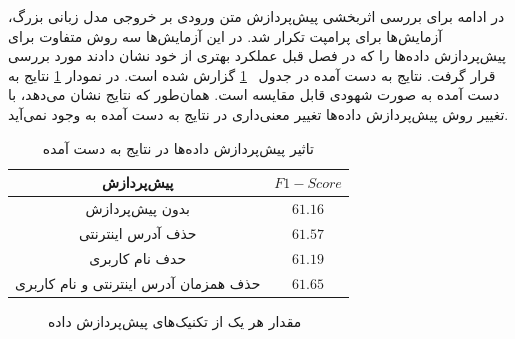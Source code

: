  
در ادامه برای بررسی اثربخشی پیش‌پردازش متن ورودی بر خروجی مدل زبانی بزرگ، آزمایش‌ها برای پرامپت
تکرار شد. در این آزمایش‌ها سه روش متفاوت برای پیش‌پردازش داده‌ها را که در فصل قبل عملکرد بهتری از خود نشان دادند مورد بررسی قرار گرفت. نتایج به دست آمده در جدول~
\ref{prompt-data-cleaning-impact}
گزارش شده است. در نمودار
\ref{prompt-data-cleaning-impact-chart}
نتایج به دست آمده به صورت شهودی قابل مقایسه است. همان‌طور که نتایج نشان می‌دهد، با تغییر روش پیش‌پردازش داده‌ها تغییر معنی‌داری در نتایج به دست آمده به وجود نمی‌آید. 
\begin{table}[h!]
	\centering
	\small
	\caption{\label{prompt-data-cleaning-impact}تاثیر پیش‌پردازش داده‌ها در نتایج به دست آمده}
	\vspace{0.2cm}
	\begin{tabular}{c  |c }
	\hline
	پیش‌پردازش & $F1-Score$\\
	\hline
	
	
	بدون پیش‌پردازش&  $61.16$
	\\
	
	حذف آدرس اینترنتی&  $61.57$\\
حدف نام کاربری&  $61.19$\\
	حذف همزمان آدرس اینترنتی و نام کاربری&  $61.65$\\
	\hline
	\hline
\end{tabular}
\end{table}

\begin{figure}[H]
	\caption{مقدار
		هر یک از تکنیک‌های پیش‌پردازش داده}
	\label{prompt-data-cleaning-impact-chart}
\end{figure}



